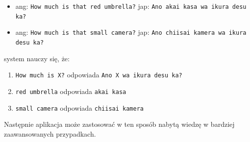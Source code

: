  \begin{itemize}
	\item ang: \verb"How much is that red umbrella?" jap: \verb"Ano akai kasa wa ikura desu ka?"
	\item ang: \verb"How much is that small camera?" jap: \verb"Ano chiisai kamera wa ikura desu ka?"
\end{itemize} 
system nauczy się, że:
 \begin{enumerate}
	\item \verb"How much is X?" odpowiada \verb"Ano X wa ikura desu ka?"
	\item \verb"red umbrella" odpowiada \verb"akai kasa"
	\item \verb"small camera" odpowiada \verb"chiisai kamera"
\end{enumerate} 
Następnie aplikacja może zastosować w ten sposób nabytą wiedzę w bardziej zaawansowanych przypadkach.

